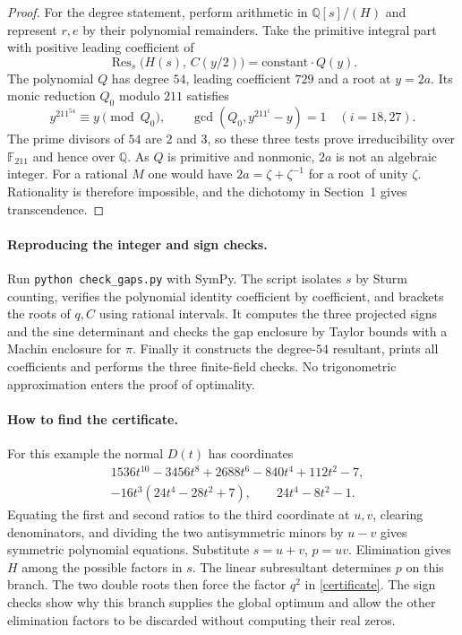 \documentclass[10pt]{article}
\newcommand{\Q}{\mathbb Q}
\newcommand{\Res}{\operatorname{Res}}
\begin{document}
\begin{proof}
For the degree statement, perform arithmetic in $\Q[s]/(H)$ and represent $r,e$ by their polynomial remainders. Take the primitive integral part with positive leading coefficient of
\[
 \Res_s\big(H(s),\,C(y/2)\big)=\text{constant}\cdot Q(y).
\]
The polynomial $Q$ has degree $54$, leading coefficient $729$ and a root at $y=2a$. Its monic reduction $Q_0$ modulo $211$ satisfies
\[
 y^{211^{54}}\equiv y\pmod{Q_0},\qquad
 \gcd(Q_0,y^{211^i}-y)=1\quad(i=18,27).
\]
The prime divisors of $54$ are $2$ and $3$, so these three tests prove irreducibility over $\mathbb F_{211}$ and hence over $\Q$. As $Q$ is primitive and nonmonic, $2a$ is not an algebraic integer. For a rational $M$ one would have $2a=\zeta+\zeta^{-1}$ for a root of unity $\zeta$. Rationality is therefore impossible, and the dichotomy in Section~1 gives transcendence.
\end{proof}

\paragraph{Reproducing the integer and sign checks.}
Run \texttt{python check\_gaps.py} with SymPy. The script isolates $s$ by Sturm counting, verifies the polynomial identity coefficient by coefficient, and brackets the roots of $q,C$ using rational intervals. It computes the three projected signs and the sine determinant and checks the gap enclosure by Taylor bounds with a Machin enclosure for $\pi$. Finally it constructs the degree-$54$ resultant, prints all coefficients and performs the three finite-field checks. No trigonometric approximation enters the proof of optimality.

\paragraph{How to find the certificate.}
For this example the normal $D(t)$ has coordinates
\begin{align*}
 &1536t^{10}-3456t^8+2688t^6-840t^4+112t^2-7,\\
 &-16t^3(24t^4-28t^2+7),\qquad 24t^4-8t^2-1 .
\end{align*}
Equating the first and second ratios to the third coordinate at $u,v$, clearing denominators, and dividing the two antisymmetric minors by $u-v$ gives symmetric polynomial equations. Substitute $s=u+v$, $p=uv$. Elimination gives $H$ among the possible factors in $s$. The linear subresultant determines $p$ on this branch. The two double roots then force the factor $q^2$ in \eqref{certificate}. The sign checks show why this branch supplies the global optimum and allow the other elimination factors to be discarded without computing their real zeros.
\end{document}
